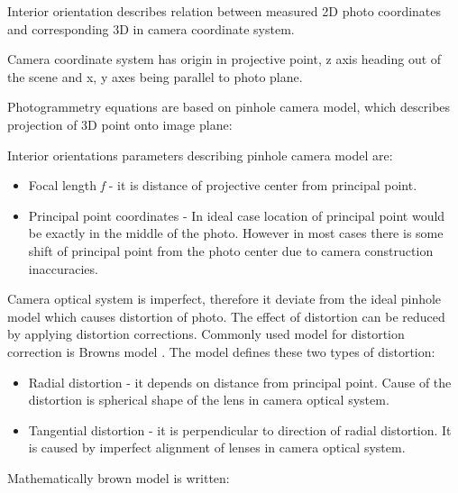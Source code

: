 \documentclass[a4paper,12pt]{report}
\newcommand{\escal}[1]{
{\it #1}
}
\begin{document}
Interior orientation describes relation between measured 2D photo coordinates 
and corresponding 3D in camera coordinate system.

Camera coordinate system has origin in projective point, z axis heading out of the scene  and x, y axes being parallel to photo plane. 

Photogrammetry equations are based on pinhole camera model, which describes projection of 3D point onto image plane:

Interior orientations parameters describing pinhole camera model are:
\begin{itemize}
  \item Focal length \escal{f} - it is distance of projective center from principal point.
  \item Principal point coordinates - In ideal case location of principal point would be exactly in the middle 
	of the photo.  However in most cases there is some shift of principal point from the photo center due to
	camera construction inaccuracies.
\end{itemize}

Camera optical system is imperfect, therefore it deviate from the ideal pinhole model which 
 causes distortion of photo.
The effect of distortion can be reduced by applying distortion corrections. Commonly 
used model for distortion correction is Browns model \cite{brown1966distortion}.
The model defines these two types of distortion:
\begin{itemize}
  \item Radial distortion - it depends on distance from principal point. Cause of the distortion is spherical shape of the 
  lens in camera optical system.
  \item Tangential distortion - it is perpendicular to direction of radial distortion. It is caused by 
       imperfect alignment of lenses in camera optical system.
\end{itemize}

Mathematically brown model is written:
\end{document}
